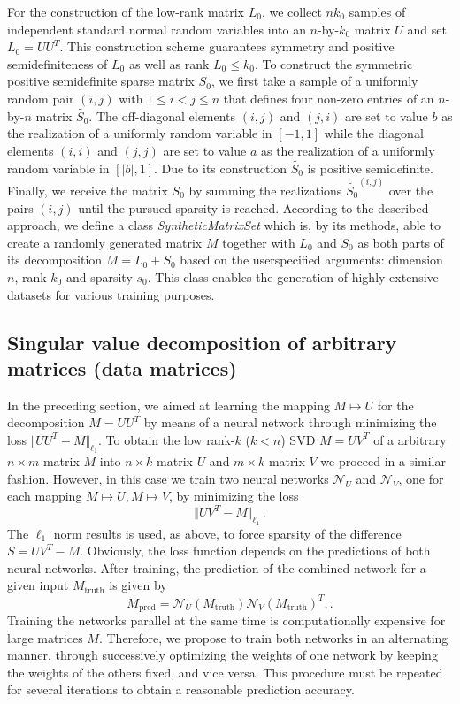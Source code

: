 For the construction of the low-rank matrix $L_0$, we collect $nk_0$ samples of independent standard normal random variables into an $n$-by-$k_0$ matrix $U$ and set $L_0 = UU^T$. This construction scheme guarantees symmetry and positive semidefiniteness of $L_0$ as well as rank $L_0 \leq k_0$. To construct the symmetric positive semidefinite sparse matrix $S_0$, we first take a sample of a uniformly random pair $(i,j)$ with $1 \leq i < j \leq n$ that defines four non-zero entries of an $n$-by-$n$ matrix $\tilde{S_0}$. The off-diagonal elements $(i,j)$ and $(j,i)$ are set to value $b$ as the realization of a uniformly random variable in $[-1,1]$ while the diagonal elements $(i,i)$ and $(j,j)$ are set to value $a$ as the realization of a uniformly random variable in $[\vert b \vert,1]$. Due to its construction $\tilde{S_0}$ is positive semidefinite. Finally, we receive the matrix $S_0$ by summing the realizations $\tilde{S_0}^{(i,j)}$ over the pairs $(i,j)$ until the pursued sparsity is reached. According to the described approach, we define a class \textit{SyntheticMatrixSet} which is, by its methods, able to create a randomly generated matrix $M$ together with $L_0$ and $S_0$ as both parts of its decomposition  $M = L_0 + S_0$ based on the userspecified arguments: dimension $n$, rank $k_0$ and sparsity $s_0$. This class enables the generation of highly extensive datasets for various training purposes.


\subsection{Singular value decomposition of arbitrary matrices (data matrices)}

In the preceding section, we aimed at learning the mapping $M\mapsto U$ for the decomposition $M = UU^T$ by means of a neural network through minimizing the loss $\Vert UU^T - M \Vert_{\ell_1}$. To obtain the low rank-$k$ ($k<n$) SVD $M = UV^T$ of a arbitrary $n\times m$-matrix $M$ into $n\times k$-matrix $U$ and $m\times k$-matrix $V$ we proceed in a similar fashion. However, in this case we train two neural networks $\mathcal{N}_U$ and $\mathcal{N}_V$, one for each mapping $M\mapsto U, M\mapsto V$, by minimizing the loss
\[
\Vert UV^T - M \Vert_{\ell_1} \,.
\]
The $\ell_1$ norm results is used, as above, to force sparsity of the difference $S = UV^T -M$. Obviously, the loss function depends on the predictions of both neural networks. After training, the prediction of the combined network for a given input $M_\text{truth}$ is given by
\[
M_\text{pred} = \mathcal{N}_U(M_\text{truth})\mathcal{N}_V(M_\text{truth})^T ,.
\]
Training the networks parallel at the same time is computationally expensive for large matrices $M$. Therefore, we propose to train both networks in an alternating manner, through successively optimizing the weights of one network by keeping the weights of the others fixed, and vice versa. This procedure must be repeated for several iterations to obtain a reasonable prediction accuracy.

